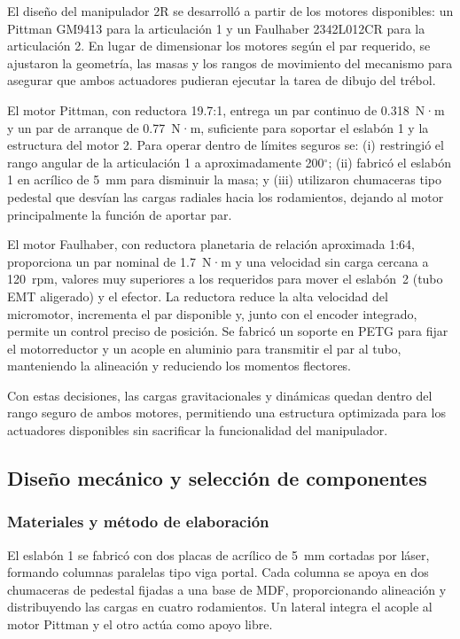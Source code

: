 \documentclass[11pt,a4paper]{article}
\begin{document}
El diseño del manipulador 2R se desarrolló a partir de los motores disponibles: un Pittman GM9413 para la articulación 1 y un Faulhaber 2342L012CR para la articulación 2. En lugar de dimensionar los motores según el par requerido, se ajustaron la geometría, las masas y los rangos de movimiento del mecanismo para asegurar que ambos actuadores pudieran ejecutar la tarea de dibujo del trébol.

El motor Pittman, con reductora 19.7:1, entrega un par continuo de 0.318~N·m y un par de arranque de 0.77~N·m, suficiente para soportar el eslabón 1 y la estructura del motor 2. Para operar dentro de límites seguros se: (i) restringió el rango angular de la articulación 1 a aproximadamente 200$^\circ$; (ii) fabricó el eslabón 1 en acrílico de 5~mm para disminuir la masa; y (iii) utilizaron chumaceras tipo pedestal que desvían las cargas radiales hacia los rodamientos, dejando al motor principalmente la función de aportar par.

El motor Faulhaber, con reductora planetaria de relación aproximada 1:64, proporciona un par nominal de 1.7~N·m y una velocidad sin carga cercana a 120~rpm, valores muy superiores a los requeridos para mover el eslabón~2 (tubo EMT aligerado) y el efector. La reductora reduce la alta velocidad del micromotor, incrementa el par disponible y, junto con el encoder integrado, permite un control preciso de posición. Se fabricó un soporte en PETG para fijar el motorreductor y un acople en aluminio para transmitir el par al tubo, manteniendo la alineación y reduciendo los momentos flectores.

Con estas decisiones, las cargas gravitacionales y dinámicas quedan dentro del rango seguro de ambos motores, permitiendo una estructura optimizada para los actuadores disponibles sin sacrificar la funcionalidad del manipulador.


\subsection{Diseño mecánico y selección de componentes}

\subsubsection{Materiales y método de elaboración}

El eslabón 1 se fabricó con dos placas de acrílico de 5~mm cortadas por láser, formando columnas paralelas tipo viga portal. Cada columna se apoya en dos chumaceras de pedestal fijadas a una base de MDF, proporcionando alineación y distribuyendo las cargas en cuatro rodamientos. Un lateral integra el acople al motor Pittman y el otro actúa como apoyo libre.
\end{document}
